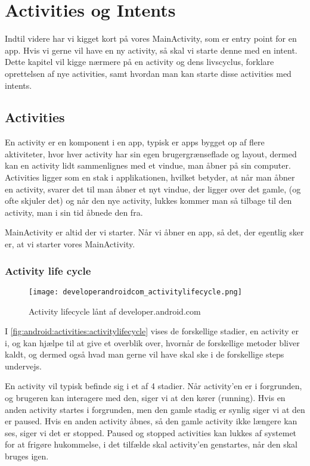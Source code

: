\chapter{Activities og Intents}
\label{cha:activities-intents}

Indtil videre har vi kigget kort på vores MainActivity, som er entry point for en app. Hvis vi gerne vil have en ny activity, så skal vi starte denne med en intent. Dette kapitel vil kigge nærmere på en activity og dens livscyclus, forklare oprettelsen af nye activities, samt hvordan man kan starte disse activities med intents.

\section{Activities}

En activity er en komponent i en app, typisk er apps bygget op af flere aktiviteter, hvor hver activity har sin egen brugergrænseflade og layout, dermed kan en activity lidt sammenlignes med et vindue, man åbner på sin computer. Activities ligger som en stak i applikationen, hvilket betyder, at når man åbner en activity, svarer det til man åbner et nyt vindue, der ligger over det gamle, (og ofte skjuler det) og når den nye activity, lukkes kommer man så tilbage til den activity, man i sin tid åbnede den fra.

MainActivity er altid der vi starter. Når vi åbner en app, så det, der egentlig sker er, at vi starter vores MainActivity.


\subsection{Activity life cycle}

\begin{figure}[h]
	\begin{center}
		\texttt{[image: developerandroidcom\_activitylifecycle.png]}
		\caption{Activity lifecycle lånt af developer.android.com}
		\label{fig:android:activities:activitylifecycle}
	\end{center}
\end{figure}

I \autoref{fig:android:activities:activitylifecycle} vises de forskellige stadier, en activity er i, og kan hjælpe til at give et overblik over, hvornår de forskellige metoder bliver kaldt, og dermed også hvad man gerne vil have skal ske i de forskellige steps undervejs.

En activity vil typisk befinde sig i et af 4 stadier. Når activity'en er i forgrunden, og brugeren kan interagere med den, siger vi at den kører (running). Hvis en anden activity startes i forgrunden, men den gamle stadig er synlig siger vi at den er paused. Hvis en anden activity åbnes, så den gamle activity ikke længere kan ses, siger vi det er stopped. Paused og stopped activities kan lukkes af systemet for at frigøre hukommelse, i det tilfælde skal activity'en genstartes, når den skal bruges igen.

